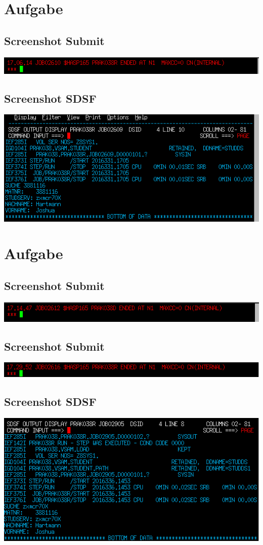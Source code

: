 \documentclass[a4paper]{scrartcl}
\begin{document}
	\section{Aufgabe}
	\subsection{Screenshot Submit}
	\includegraphics{screenshots/3_SUBMIT.png}
	
	\subsection{Screenshot SDSF}
	\includegraphics{screenshots/3_SDSF.png}
	
	
	\section{Aufgabe}
	\subsection{Screenshot Submit}
	\includegraphics{screenshots/4_SUBMIT.png}
	
	\subsection{Screenshot Submit}
	\includegraphics{screenshots/5_SUBMIT.png}
	
	\subsection{Screenshot SDSF}
	\includegraphics{screenshots/4_SDSF.png}
	
\end{document}
